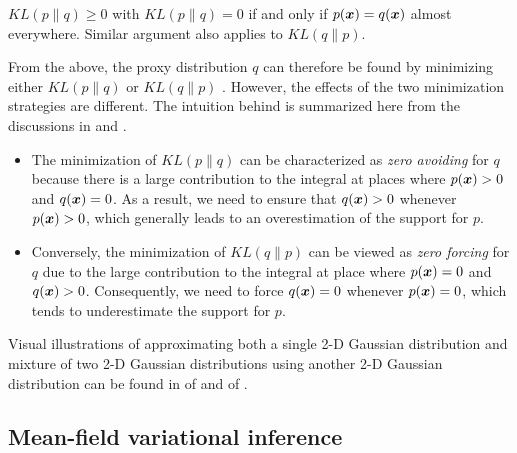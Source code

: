 \begin{theorem}
\label{theorem-kl}
    $KL(p\|q) \geqslant 0$ with $KL(p\|q) = 0$ if and only if $p(\boldsymbol{x}) = q(\boldsymbol{x})$ almost everywhere. Similar argument also applies to $KL(q\|p)$.
\end{theorem}


From the above, the proxy distribution $q$ can therefore be found by minimizing either $KL(p\|q)$  or $KL(q\|p)$  .
However, the effects of the two minimization strategies are different.
The intuition behind is summarized here from the discussions in \cite{bishop2006pattern} and \cite{murphy2012machine}.

\begin{itemize}
    \item The minimization of $KL(p\|q)$  can be characterized as \emph{zero avoiding} for $q$ because there is a large contribution to the integral at places where $p(\boldsymbol{x}) > 0$ and $q(\boldsymbol{x}) = 0$.
        As a result, we need to ensure that $q(\boldsymbol{x}) > 0$ whenever $p(\boldsymbol{x}) > 0$, which generally leads to an overestimation of the support for $p$.
    \item Conversely, the minimization of $KL(q\|p)$ can be viewed as \emph{zero forcing} for $q$ due to the large contribution to the integral at place where $p(\boldsymbol{x}) = 0$ and $q(\boldsymbol{x}) > 0$.
        Consequently, we need to force $q(\boldsymbol{x}) = 0$ whenever $p(\boldsymbol{x}) = 0$, which tends to underestimate the support for $p$.
\end{itemize}

Visual illustrations of approximating both a single 2-D Gaussian distribution and mixture of two 2-D Gaussian distributions using another 2-D Gaussian distribution can be found in  of \cite{bishop2006pattern} and  of \cite{murphy2012machine}.

\subsection{Mean-field variational inference}
\label{sec-vi}

